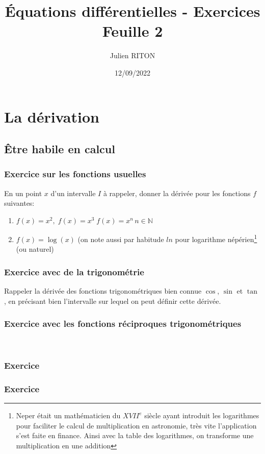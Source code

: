 \documentclass[10pt,a4paper]{article}
\author{Julien RITON}
\title{Équations différentielles - Exercices Feuille 2}
\date{12/09/2022}
\begin{document}
\maketitle

\section{La dérivation}

\subsection{Être habile en calcul}
\subsubsection{Exercice sur les fonctions usuelles}
En un point $x$ d'un intervalle $I$ à rappeler, donner la dérivée pour les fonctions $f$ suivantes:
\begin{enumerate}
\item
$f(x)=x^2,\; f(x)=x^3 \; f(x)=x^n\, n\in\mathbb{N}$
\item
$f(x)=\log(x)$ (on note aussi par habitude $ln$ pour logarithme népérien\footnote{Neper était un mathématicien du $XVII^e$ siècle ayant introduit les logarithmes pour faciliter le calcul de multiplication en astronomie, très vite l'application s'est faite en finance. Ainsi avec la table des logarithmes, on transforme une multiplication en une addition}  (ou naturel)
\end{enumerate} 

\subsubsection{Exercice avec de la trigonométrie}
Rappeler la dérivée des fonctions trigonométriques bien connue $\cos$, $\sin$ et $\tan$, en précisant bien l'intervalle sur lequel on peut définir cette dérivée.



\subsubsection{Exercice avec les fonctions réciproques trigonométriques}
\


\subsubsection{Exercice}

\subsubsection{Exercice}
\end{document}
